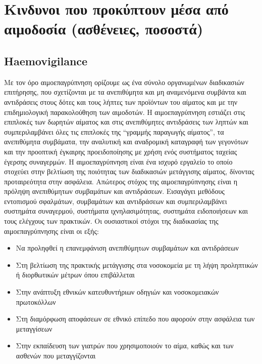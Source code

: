 \section{Κινδυνοι που προκύπτουν μέσα από αιμοδοσία (ασθένειες, ποσοστά)}
	\subsection{Haemovigilance}
	Με τον όρο αιμοεπαγρύπνηση ορίζουμε ως ένα σύνολο οργανωμένων διαδικασιών επιτήρησης, που σχετίζονται με τα ανεπιθύμητα και μη αναμενόμενα συμβάντα και αντιδράσεις στους δότες και τους λήπτες των προϊόντων του αίματος και με την επιδημιολογική παρακολούθηση των αιμοδοτών. \cite{VOX:VOX1442}Η αιμοεπαγρύπνηση εστιάζει στις  επιπλοκές των δωρητών αίματος και στις ανεπιθύμητες αντιδράσεις των ληπτών και συμπεριλαμβάνει όλες τις επιπλοκές της “γραμμής παραγωγής αίματος”, τα ανεπιθύμητα συμβάματα, την αναλυτική και αναδρομική καταγραφή των γεγονότων και την προοπτική έγκαιρης προειδοποίησης με χρήση ενός συστήματος ταχείας έγερσης συναγερμών. Η αιμοεπαγρύπνηση είναι ένα ισχυρό εργαλείο το οποίο στοχεύει στην βελτίωση της ποιότητας των διαδικασιών μετάγγισης αίματος, δίνοντας προταιρεότητα στην ασφάλεια. Απώτερος στόχος της αιμοεπαγρύπνησης είναι η πρόληψη ανεπιθύμητων συμβαμάτων και αντιδράσεων. Εισαγάγει μεθόδους εντοπισμού σφαλμάτων, συμβαμάτων και αντιδράσεων και συμπεριλαμβάνει συστημάτα συναγερμού, συστήματα ιχνηλασιμότητας, συστημάτα ειδοποιήσεων και τους ελέγχους των πρακτικών.
	Οι ουσιαστικοί στόχοι της διαδικασίας της αιμοεπαγρύπνησης είναι οι εξής:
		\begin{itemize}
		\item Να προληφθεί η επανεμφάνιση ανεπιθύμητων συμβαμάτων και αντιδράσεων 
		\item Στη βελτίωση της πρακτικής μετάγγισης στα νοσοκομεία με τη λήψη προληπτικών ή διορθωτικών μέτρων όπου επιβάλλεται 
		\item Στην ανάπτυξη εθνικών κατευθυντήριων οδηγιών και νοσοκομειακών πρωτοκόλλων 
		\item Στη διαμόρφωση αποφάσεων σε εθνικό επίπεδο που αφορούν στην ασφάλεια των μεταγγίσεων 
		\item Στην εκπαίδευση των γιατρών που χρησιμοποιούν το αίμα, καθώς και των ασθενών που μεταγγίζονται 
		\end{itemize}

